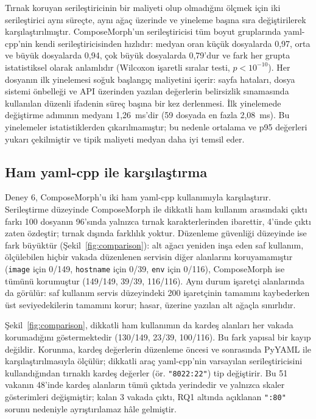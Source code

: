 \documentclass[conference]{IEEEtran}
\begin{document}
Tırnak koruyan serileştiricinin bir maliyeti olup olmadığını ölçmek için
iki serileştirici aynı süreçte, aynı ağaç üzerinde ve yineleme başına sıra
değiştirilerek karşılaştırılmıştır. ComposeMorph'un serileştiricisi tüm
boyut gruplarında yaml-cpp'nin kendi serileştiricisinden hızlıdır: medyan
oran küçük dosyalarda 0,97, orta ve büyük dosyalarda 0,94, çok büyük
dosyalarda 0,79'dur ve fark her grupta istatistiksel olarak anlamlıdır
(Wilcoxon işaretli sıralar testi, $p < 10^{-10}$). Her dosyanın ilk
yinelemesi soğuk başlangıç maliyetini içerir: sayfa hataları, dosya sistemi
önbelleği ve API üzerinden yazılan değerlerin belirsizlik sınamasında
kullanılan düzenli ifadenin süreç başına bir kez derlenmesi. İlk yinelemede
değiştirme adımının medyanı 1,26~ms'dir (59 dosyada en fazla 2,08~ms).
Bu yinelemeler istatistiklerden çıkarılmamıştır; bu nedenle ortalama ve
p95 değerleri yukarı çekilmiştir ve tipik maliyeti medyan daha iyi temsil
eder.

\subsection{Ham yaml-cpp ile karşılaştırma}
Deney 6, ComposeMorph'u iki ham yaml-cpp kullanımıyla karşılaştırır.
Serileştirme düzeyinde ComposeMorph ile dikkatli ham kullanım arasındaki
çıktı farkı 100 dosyanın 96'sında yalnızca tırnak karakterlerinden
ibarettir, 4'ünde çıktı zaten özdeştir; tırnak dışında farklılık yoktur.
Düzenleme güvenliği düzeyinde ise fark büyüktür (Şekil~\ref{fig:comparison}):
alt ağacı yeniden inşa eden saf kullanım, ölçülebilen hiçbir vakada
düzenlenen servisin diğer alanlarını koruyamamıştır (\texttt{image} için 0/149, \texttt{hostname}
için 0/39, \texttt{env} için 0/116), ComposeMorph ise tümünü korumuştur
(149/149, 39/39, 116/116). Aynı durum işaretçi alanlarında da görülür:
saf kullanım servis düzeyindeki 200 işaretçinin tamamını kaybederken üst
seviyedekilerin tamamını korur; hasar, üzerine yazılan alt ağaçla sınırlıdır.

Şekil~\ref{fig:comparison}, dikkatli ham kullanımın da kardeş alanları
her vakada korumadığını göstermektedir (130/149, 23/39, 100/116). Bu fark
yapısal bir kayıp değildir. Korunma, kardeş değerlerin düzenleme öncesi ve
sonrasında PyYAML ile karşılaştırılmasıyla ölçülür; dikkatli araç
yaml-cpp'nin varsayılan serileştiricisini kullandığından tırnaklı kardeş
değerler (ör. \texttt{"8022:22"}) tip değiştirir. Bu 51 vakanın 48'inde
kardeş alanların tümü çıktıda yerindedir ve yalnızca skaler gösterimleri
değişmiştir; kalan 3 vakada çıktı, RQ1 altında açıklanan \texttt{":80"}
sorunu nedeniyle ayrıştırılamaz hâle gelmiştir.
\end{document}
